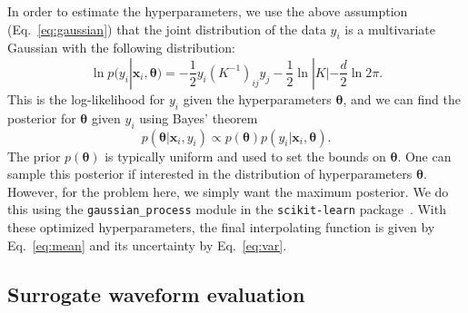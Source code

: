 \documentclass[prd,aps,letter,twocolumn,floatfix,notitlepage,nofootinbib]{revtex4-1}
\def\bx{\mathbf{x}}
\def\btheta{\boldsymbol{\theta}}
\begin{document}
In order to estimate the hyperparameters, we use the above assumption (Eq.~\eqref{eq:gaussian}) that the joint distribution of 
the data $y_i$ is a multivariate Gaussian with the following distribution:
\begin{equation}
\ln p(y_i | \bx_i, {\bm \theta}) = -\frac{1}{2} y_i (K^{-1})_{ij} y_j - \frac{1}{2} \ln |K| - \frac{d}{2} \ln 2\pi.
\end{equation}
This is the log-likelihood for $y_i$ given the hyperparameters ${\bm \theta}$, and we can find the posterior for ${\bm \theta}$
given $y_i$ using Bayes' theorem
\begin{equation}
p({\bm \theta} | \bx_i, y_i) \propto p({\bm \theta}) p(y_i | \bx_i, {\bm \theta}).
\end{equation}
The prior $p({\bm \theta})$ is typically uniform and used to set the bounds on ${\bm \theta}$. One can sample this posterior if interested in the distribution of hyperparameters $\btheta$. However, for the problem here, we simply want the maximum posterior. We do this using the \texttt{gaussian\_process} module in the \texttt{scikit-learn} package~\cite{scikit-learn}. With these optimized hyperparameters, the final interpolating function is given by Eq.~\eqref{eq:mean} and its uncertainty by Eq.~\eqref{eq:var}. 


\subsection{Surrogate waveform evaluation}
\end{document}
